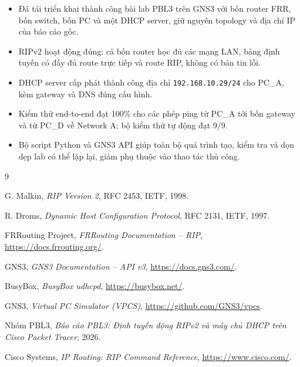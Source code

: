 \documentclass[12pt,a4paper]{article}
\renewcommand{\thesection}{\Roman{section}}
\renewcommand{\thesubsection}{\arabic{section}.\arabic{subsection}}
\begin{document}
\begin{itemize}[leftmargin=1.6em,itemsep=2pt]
  \item Đã tái triển khai thành công bài lab PBL3 trên GNS3 với bốn router FRR, bốn switch, bốn
        PC và một DHCP server, giữ nguyên topology và địa chỉ IP của báo cáo gốc.
  \item RIPv2 hoạt động đúng: cả bốn router học đủ các mạng LAN, bảng định tuyến có đầy đủ route
        trực tiếp và route RIP, không có bản tin lỗi.
  \item DHCP server cấp phát thành công địa chỉ \texttt{192.168.10.29/24} cho PC\_A, kèm gateway
        và DNS đúng cấu hình.
  \item Kiểm thử end-to-end đạt 100\% cho các phép ping từ PC\_A tới bốn gateway và từ PC\_D về
        Network A; bộ kiểm thử tự động đạt 9/9.
  \item Bộ script Python và GNS3 API giúp toàn bộ quá trình tạo, kiểm tra và dọn dẹp lab có thể
        lặp lại, giảm phụ thuộc vào thao tác thủ công.
\end{itemize}

\begin{thebibliography}{9}

G. Malkin, \emph{RIP Version 2}, RFC 2453, IETF, 1998.

R. Droms, \emph{Dynamic Host Configuration Protocol}, RFC 2131, IETF, 1997.

FRRouting Project, \emph{FRRouting Documentation -- RIP}, \url{https://docs.frrouting.org/}.

GNS3, \emph{GNS3 Documentation -- API v3}, \url{https://docs.gns3.com/}.

BusyBox, \emph{BusyBox udhcpd}, \url{https://busybox.net/}.

GNS3, \emph{Virtual PC Simulator (VPCS)}, \url{https://github.com/GNS3/vpcs}.

Nhóm PBL3, \emph{Báo cáo PBL3: Định tuyến động RIPv2 và máy chủ DHCP trên Cisco Packet Tracer},
2026.

Cisco Systems, \emph{IP Routing: RIP Command Reference}, \url{https://www.cisco.com/}.

\end{thebibliography}

\appendix
\renewcommand{\thesubsection}{\thesection.\arabic{subsection}}
\end{document}
